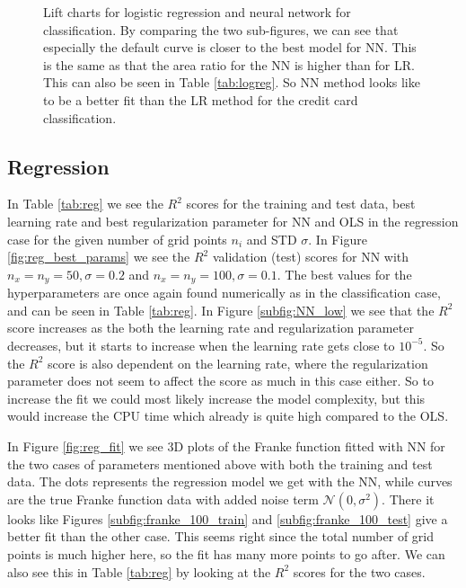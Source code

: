 \documentclass[12pt,a4paper,english]{article}
\begin{document}
\begin{figure}[htbp]
	\hspace{0.5em}
	\caption{Lift charts for logistic regression and neural network for classification. By comparing the two sub-figures, we can see that especially the default curve is closer to the best model for NN. This is the same as that the area ratio for the NN is higher than for LR. This can also be seen in Table \ref{tab:logreg}. So NN method looks like to be a better fit than the LR method for the credit card classification.\label{fig:class_lift_charts}}
\end{figure}

\subsection{Regression}
\label{subsect:result_reg}
In Table \ref{tab:reg} we see the $R^2$ scores for the training and test data, best learning rate and best regularization parameter for NN and OLS in the regression case for the given number of grid points $n_i$ and STD $\sigma$. In Figure \ref{fig:reg_best_params} we see the $R^2$ validation (test) scores for NN with $n_x=n_y=50, \sigma=0.2$ and $n_x=n_y=100,\sigma=0.1$. The best values for the hyperparameters are once again found numerically as in the classification case, and can be seen in Table \ref{tab:reg}. In Figure \ref{subfig:NN_low} we see that the $R^2$ score increases as the both the learning rate and regularization parameter decreases, but it starts to increase when the learning rate gets close to $10^{-5}$. So the $R^2$ score is also dependent on the learning rate, where the regularization parameter does not seem to affect the score as much in this case either. So to increase the fit we could most likely increase the model complexity, but this would increase the CPU time which already is quite high compared to the OLS.

In Figure \ref{fig:reg_fit} we see 3D plots of the Franke function fitted with NN for the two cases of parameters mentioned above with both the training and test data. The dots represents the regression model we get with the NN, while curves are the true Franke function data with added noise term $\mathcal{N}(0,\sigma^2)$. There it looks like Figures \ref{subfig:franke_100_train} and \ref{subfig:franke_100_test} give a better fit than the other case. This seems right since the total number of grid points is much higher here, so the fit has many more points to go after. We can also see this in Table \ref{tab:reg} by looking at the $R^2$ scores for the two cases.
\end{document}
